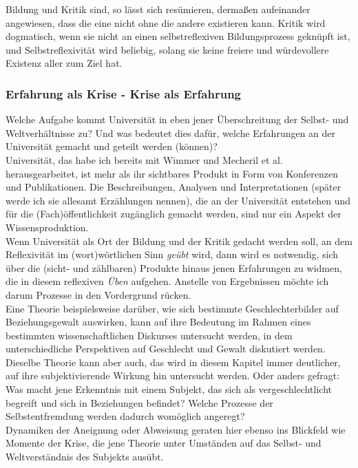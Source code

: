 \noindent Bildung und Kritik sind, so lässt sich resümieren, dermaßen aufeinander
angewiesen, dass die  eine nicht ohne die andere existieren kann. Kritik wird
dogmatisch, wenn sie nicht an einen selbstreflexiven Bildungsprozess geknüpft
ist, und Selbstreflexivität wird beliebig, solang sie keine freiere und
würdevollere Existenz aller zum Ziel hat. 

\subsubsection{Erfahrung als Krise - Krise als Erfahrung}

Welche Aufgabe kommt Universität in eben jener Überschreitung der Selbst- und
Weltverhältnisse zu? Und was bedeutet dies dafür, welche Erfahrungen an der
Universität gemacht und geteilt werden (können)? \\
Universität, das habe ich
bereits mit Wimmer und Mecheril et al. herausgearbeitet, ist mehr als ihr
sichtbares Produkt in Form von Konferenzen und Publikationen. Die
Beschreibungen, Analysen und Interpretationen (später werde ich sie allesamt
Erzählungen nennen), die an der Universität entstehen und für die
(Fach)öffentlichkeit zugänglich gemacht werden, sind nur ein Aspekt der
Wissensproduktion.\\ 

\noindent Wenn Universität als Ort der Bildung und der Kritik gedacht
werden soll, an dem Reflexivität im (wort)wörtlichen Sinn \textit{geübt} wird, dann wird
es notwendig, sich über die (sicht- und zählbaren) Produkte hinaus jenen
Erfahrungen zu widmen, die in diesem reflexiven \textit{Üben} aufgehen. Anstelle von
Ergebnissen möchte ich darum Prozesse in den Vordergrund rücken.\\  

\noindent Eine Theorie
beispielsweise darüber, wie sich bestimmte Geschlechterbilder auf
Beziehungsgewalt auswirken, kann auf ihre Bedeutung im Rahmen eines bestimmten
wissenschaftlichen Diskurses untersucht werden, in dem unterschiedliche
Perspektiven auf Geschlecht und Gewalt diskutiert werden. Dieselbe Theorie kann
aber auch, das wird in diesem Kapitel immer deutlicher, auf ihre
subjektivierende Wirkung hin untersucht werden. Oder anders gefragt:\\
Was macht
jene Erkenntnis mit einem Subjekt, das sich als vergeschlechtlicht begreift und
sich in Beziehungen befindet? Welche Prozesse der Selbstentfremdung werden
dadurch womöglich angeregt?\\
Dynamiken der Aneignung oder Abweisung geraten
hier ebenso ins Blickfeld wie Momente der Krise, die jene Theorie unter
Umständen auf das Selbst- und Weltverständnis des Subjekts ausübt. \\
 
